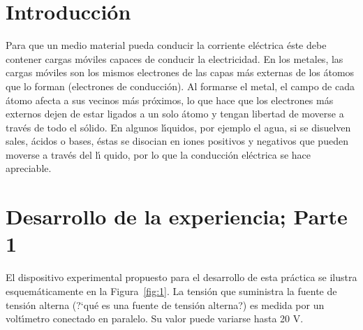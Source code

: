 \documentclass[laboratorio]{guia}
\begin{document}
 
\maketitle

\section{Introducci\'on}

Para que un medio material pueda conducir la corriente el\'ectrica \'este debe
contener cargas m\'oviles capaces de conducir la electricidad. En los metales,
las cargas m\'oviles son los mismos electrones de las capas m\'as externas de
los \'atomos que lo forman (electrones de conducci\'on). Al formarse el metal,
el campo de cada \'atomo afecta a sus vecinos m\'as pr\'oximos, lo que hace que
los electrones m\'as externos dejen de estar ligados a un solo \'atomo y tengan
libertad de moverse a trav\'es de todo el s\'olido. En algunos l\'\i quidos,
por ejemplo el agua, si se disuelven sales, \'acidos o bases, \'estas se
disocian en iones positivos y negativos que pueden moverse a trav\'es del l\'\i
quido, por lo que la conducci\'on el\'ectrica se hace apreciable.

\section{Desarrollo de la experiencia; Parte 1}

El dispositivo experimental propuesto para el desarrollo de esta pr\'actica se
ilustra esquem\'aticamente en la Figura~\ref{fig:1}. La tensi\'on que
suministra la fuente de tensi\'on alterna (?`qu\'e es una fuente de tensi\'on
alterna?) es medida por un volt\'\i metro conectado en paralelo. Su valor puede
variarse hasta 20 V. 
\end{document}
